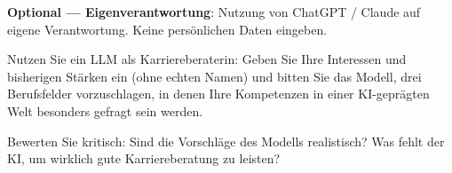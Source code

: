 \begin{mychallenge}[KI-Karriereberatung]
\begin{myattention}
\textbf{Optional --- Eigenverantwortung}: Nutzung von ChatGPT / Claude auf eigene
Verantwortung. Keine persönlichen Daten eingeben.
\end{myattention}

Nutzen Sie ein LLM als Karriereberaterin: Geben Sie Ihre Interessen und
bisherigen Stärken ein (ohne echten Namen) und bitten Sie das Modell,
drei Berufsfelder vorzuschlagen, in denen Ihre Kompetenzen in einer
KI-geprägten Welt besonders gefragt sein werden.

Bewerten Sie kritisch: Sind die Vorschläge des Modells realistisch?
Was fehlt der KI, um wirklich gute Karriereberatung zu leisten?
\end{mychallenge}
